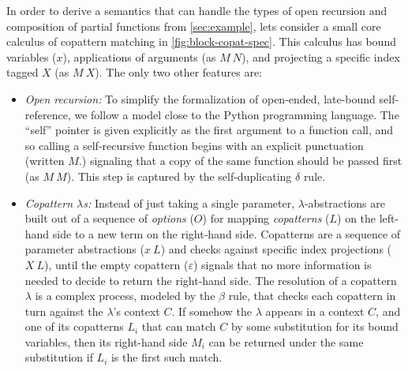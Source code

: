 \documentclass[sigplan,screen]{acmart}
\begin{document}
In order to derive a semantics that can handle the types of open recursion and
composition of partial functions from \cref{sec:example}, lets consider a small
core calculus of copattern matching in \cref{fig:block-copat-spec}.  This
calculus has bound variables ($x$), applications of arguments (as $M~N$), and
projecting a specific index tagged $X$ (as $M~X$).  The only two other features
are:
\begin{itemize}
\item \emph{Open recursion:} To simplify the formalization of open-ended,
  late-bound self-reference, we follow a model close to the Python programming
  language.  The ``self'' pointer is given explicitly as the first argument to a
  function call, and so calling a self-recursive function begins with an
  explicit punctuation (written $M.$) signaling that a copy of the same
  function should be passed first (as $M~M$).  This step is captured by the
  self-duplicating $\delta$ rule.
\item \emph{Copattern $\lambda$s:} Instead of just taking a single parameter,
  $\lambda$-abstractions are built out of a sequence of \emph{options} ($O$) for
  mapping \emph{copatterns} ($L$) on the left-hand side to a new term on the
  right-hand side.  Copatterns are a sequence of parameter abstractions ($x~L$)
  and checks against specific index projections ($X~L$), until the empty
  copattern ($\varepsilon$) signals that no more information is needed to decide
  to return the right-hand side.  The resolution of a copattern $\lambda$ is a
  complex process, modeled by the $\beta$ rule, that checks each copattern in
  turn against the $\lambda$'s context $C$.  If somehow the $\lambda$ appears in
  a context $C$, and one of its copatterns $L_i$ that can match $C$ by some
  substitution for its bound variables, then its right-hand side $M_i$ can be
  returned under the same substitution if $L_i$ is the first such match.
\end{itemize}
\end{document}
